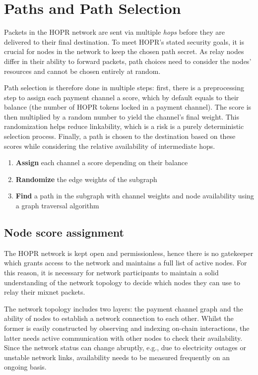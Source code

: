 \section{Paths and Path Selection}
\label{sec:path-selection}

Packets in the HOPR network are sent via multiple \textit{hops} before they are delivered to their final destination. To meet HOPR's stated security goals, it is crucial for nodes in the network to keep the chosen path secret. As relay nodes differ in their ability to forward packets, path choices need to consider the nodes' resources and cannot be chosen entirely at random.

Path selection is therefore done in multiple steps: first, there is a preprocessing step to assign each payment channel a score, which by default equals to their balance (the number of HOPR tokens locked in a payment channel). The score is then multiplied by a random number to yield the channel's final weight. This randomization helps reduce linkability, which is a risk is a purely deterministic selection process. Finally, a path is chosen to the destination based on these scores while considering the relative availability of intermediate hops.

\begin{enumerate}
    \item \textbf{Assign} each channel a score depending on their balance
    \item \textbf{Randomize} the edge weights of the subgraph
    \item \textbf{Find} a path in the subgraph with channel weights and node availability using a graph traversal algorithm
\end{enumerate}

\subsection{Node score assignment}
\label{sec:path-selection:node-score}

The HOPR network is kept open and permissionless, hence there is no gatekeeper which grants access to the network and maintains a full list of active nodes. For this reason, it is necessary for network participants to maintain a solid understanding of the network topology to decide which nodes they can use to relay their mixnet packets.

The network topology includes two layers: the payment channel graph and the ability of nodes to establish a network connection to each other. Whilst the former is easily constructed by observing and indexing on-chain interactions, the latter needs active communication with other nodes to check their availability. Since the network status can change abruptly, e.g., due to electricity outages or unstable network links, availability needs to be measured frequently on an ongoing basis.

